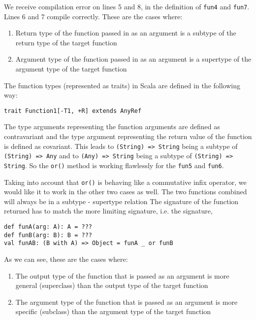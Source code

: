 We receive compilation error on lines 5 and 8, in the definition of \lstinline|fun4| and \lstinline|fun7|. Lines 6 and 7 compile correctly. These are the cases where:

\begin{enumerate}
	\item Return type of the function passed in as an argument is a subtype of the return type of the target function
	\item Argument type of the function passed in as an argument is a supertype of the argument type of the target function
\end{enumerate}

The function types (represented as traits) in Scala are defined in the following way:
\lstset{style=Scala}
\begin{lstlisting}
trait Function1[-T1, +R] extends AnyRef
\end{lstlisting}

The type arguments representing the function arguments are defined as contravariant and the type argument representing the return value of the function is defined as covariant. This leads to \lstinline|(String) => String| being a subtype of \lstinline|(String) => Any| and to \lstinline|(Any) => String| being a subtype of \lstinline|(String) => String|. So the \lstinline|or()| method is working flawlessly for the \lstinline|fun5| and \lstinline|fun6|.

Taking into account that \lstinline|or()| is behaving like a commutative infix operator, we would like it to work in the other two cases as well. The two functions combined will always be in a subtype - supertype relation The signature of the function returned has to match the more limiting signature, i.e. the signature,

\begin{lstlisting}
def funA(arg: A): A = ???
def funB(arg: B): B = ???
val funAB: (B with A) => Object = funA _ or funB
\end{lstlisting}


As we can see, these are the cases where:

\begin{enumerate}
	\item The output type of the function that is passed as an argument is more general (superclass) than the output type of the target function
	\item The argument type of the function that is passed as an argument is more specific (subclass) than the argument type of the target function
\end{enumerate}

